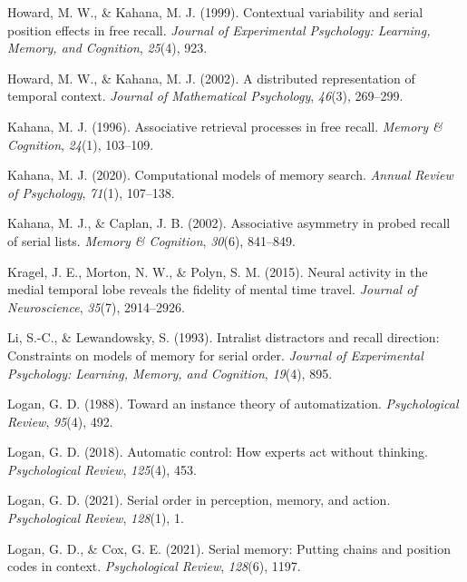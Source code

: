 \documentclass[
  man,
  floatsintext,
  longtable,
  nolmodern,
  notxfonts,
  notimes,
  draftfirst,
  colorlinks=true,linkcolor=blue,citecolor=blue,urlcolor=blue]{apa7}
\newlength{\cslhangindent}
\newenvironment{CSLReferences}[2] %
 {\begin{list}{}{%
  \setlength{\itemindent}{0pt}
  \setlength{\leftmargin}{0pt}
  \setlength{\parsep}{0pt}
  \ifodd #1
   \setlength{\leftmargin}{\cslhangindent}
   \setlength{\itemindent}{-1\cslhangindent}
  \fi
  \setlength{\itemsep}{#2\baselineskip}}}
 {\end{list}}
\begin{document}
\begin{CSLReferences}{1}{0}
Howard, M. W., \& Kahana, M. J. (1999). Contextual variability and
serial position effects in free recall. \emph{Journal of Experimental
Psychology: Learning, Memory, and Cognition}, \emph{25}(4), 923.

Howard, M. W., \& Kahana, M. J. (2002). A distributed representation of
temporal context. \emph{Journal of Mathematical Psychology},
\emph{46}(3), 269--299.

Kahana, M. J. (1996). Associative retrieval processes in free recall.
\emph{Memory \& Cognition}, \emph{24}(1), 103--109.

Kahana, M. J. (2020). Computational models of memory search.
\emph{Annual Review of Psychology}, \emph{71}(1), 107--138.

Kahana, M. J., \& Caplan, J. B. (2002). Associative asymmetry in probed
recall of serial lists. \emph{Memory \& Cognition}, \emph{30}(6),
841--849.

Kragel, J. E., Morton, N. W., \& Polyn, S. M. (2015). Neural activity in
the medial temporal lobe reveals the fidelity of mental time travel.
\emph{Journal of Neuroscience}, \emph{35}(7), 2914--2926.

Li, S.-C., \& Lewandowsky, S. (1993). Intralist distractors and recall
direction: Constraints on models of memory for serial order.
\emph{Journal of Experimental Psychology: Learning, Memory, and
Cognition}, \emph{19}(4), 895.

Logan, G. D. (1988). Toward an instance theory of automatization.
\emph{Psychological Review}, \emph{95}(4), 492.

Logan, G. D. (2018). Automatic control: How experts act without
thinking. \emph{Psychological Review}, \emph{125}(4), 453.

Logan, G. D. (2021). Serial order in perception, memory, and action.
\emph{Psychological Review}, \emph{128}(1), 1.

Logan, G. D., \& Cox, G. E. (2021). Serial memory: Putting chains and
position codes in context. \emph{Psychological Review}, \emph{128}(6),
1197.


\end{CSLReferences}
\end{document}
